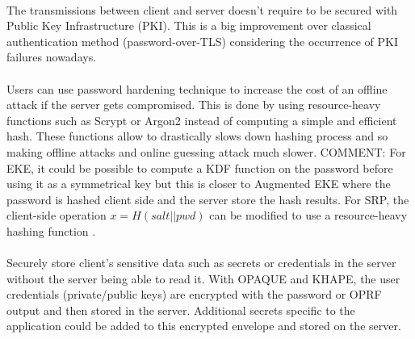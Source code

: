﻿\documentclass[../report.tex]{subfiles}
\begin{document}
\paragraph{} %
The transmissions between client and server doesn't require to be secured with Public Key Infrastructure (PKI). This is a big improvement over classical authentication method (password-over-TLS) considering the occurrence of PKI failures nowadays. %
\paragraph{} \label{sec:password_hardening_comparison}
Users can use password hardening technique to increase the cost of an offline attack if the server gets compromised. This is done by using resource-heavy functions such as Scrypt \cite{Scrypt_Paper} or Argon2 \cite{Argon2_Paper} instead of computing a simple and efficient hash. These functions allow to drastically slows down hashing process and so making offline attacks and online guessing attack much slower.
COMMENT: For EKE, it could be possible to compute a KDF function on the password before using it as a symmetrical key but this is closer to Augmented EKE \cite{AEKE_Paper} where the password is hashed client side and the server store the hash results.
For SRP, the client-side operation $x = H(salt||pwd)$ can be modified to use a resource-heavy hashing function \cite{SRP_1Password_blog}.
\paragraph{}
Securely store client's sensitive data such as secrets or credentials in the server without the server being able to read it. With OPAQUE and KHAPE, the user credentials (private/public keys) are encrypted with the password or OPRF output and then stored in the server. Additional secrets specific to the application could be added to this encrypted envelope and stored on the server.
\end{document}
